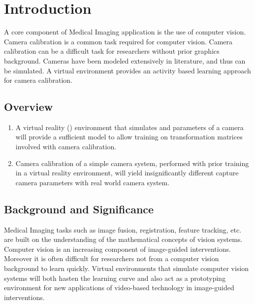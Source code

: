 \documentclass[11pt]{report}
\begin{document}
\chapter{Introduction}
  
A core component of Medical Imaging application is the use of computer vision. Camera calibration is a common task required for computer vision. Camera calibration can be a difficult task for researchers without prior graphics background. Cameras have been modeled extensively in literature, and thus can be simulated. A virtual environment provides an activity based learning approach for camera calibration. 
     
\section{Overview}


  
\begin{enumerate}
\item A virtual reality () environment that simulates  and  parameters of a camera will provide a sufficient model to allow training on transformation matrices involved with camera calibration.
\item Camera calibration of a simple camera system, performed with prior training in a virtual reality environment, will yield insignificantly different capture camera parameters with real world camera system. 
\end{enumerate}

\section{Background and Significance}

Medical Imaging tasks such as image fusion, registration, feature tracking, etc. are built on the understanding of the mathematical concepts of vision systems. Computer vision is an increasing component of image-guided interventions. Moreover it is often difficult for researchers not from a computer vision background to learn quickly. Virtual environments that simulate computer vision systems will both hasten the learning curve and also act as a prototyping environment for new applications of video-based technology in image-guided interventions. 
\end{document}
